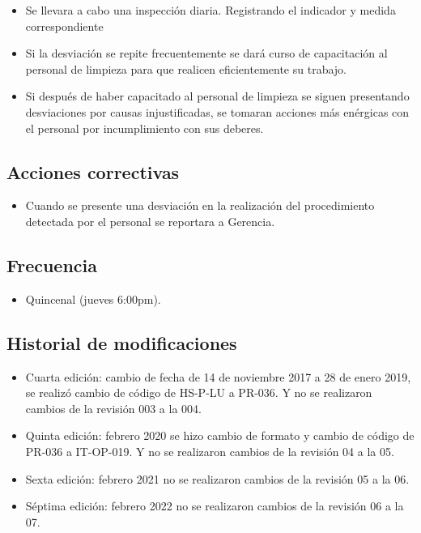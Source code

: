 \begin{itemize}
	\item Se llevara a cabo una inspección diaria. Registrando el indicador y medida correspondiente
	\item Si la desviación se repite frecuentemente se dará curso de capacitación al personal de limpieza para que realicen eficientemente su trabajo.
	\item Si después de haber capacitado al personal de limpieza se siguen presentando desviaciones por causas injustificadas, se tomaran acciones más enérgicas con el personal por incumplimiento con sus deberes.
\end{itemize}

\subsection{Acciones correctivas}

\begin{itemize}
	\item Cuando se presente una desviación en la realización del procedimiento detectada por el personal se reportara a Gerencia.
\end{itemize}

\subsection{Frecuencia}

\begin{itemize}
	\item Quincenal (jueves 6:00pm).
\end{itemize}

\subsection{Historial de modificaciones}

\begin{itemize}
	\item Cuarta edición: cambio de fecha de 14 de noviembre 2017 a 28 de enero 2019, se realizó cambio de código de HS-P-LU a PR-036. Y no se realizaron cambios de la revisión 003 a la 004.
	\item Quinta edición: febrero 2020 se hizo cambio de formato y cambio de código de PR-036 a IT-OP-019. Y no se realizaron cambios de la revisión 04 a la 05.
	\item Sexta edición: febrero 2021 no se realizaron cambios de la revisión 05 a la 06.
	\item Séptima edición: febrero 2022 no se realizaron cambios de la revisión 06 a la 07.
\end{itemize}
